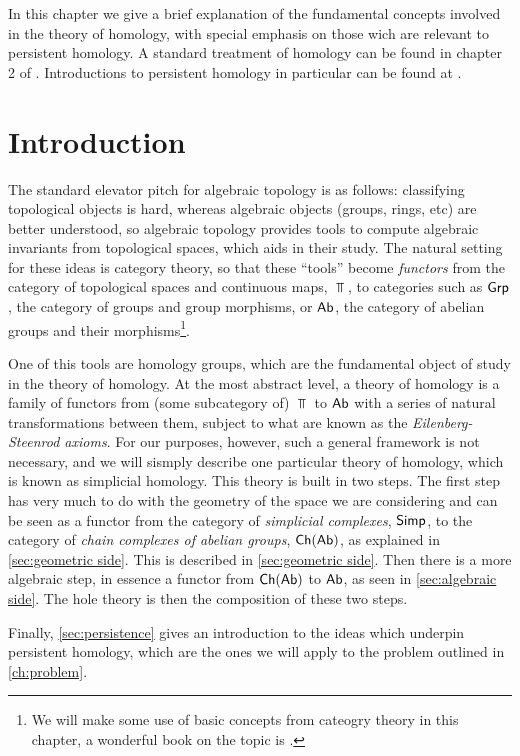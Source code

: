 \documentclass[../main.tex]{subfiles}
\begin{document}
In this chapter we give a brief explanation of the fundamental concepts involved in the
theory of homology, with special emphasis on those wich are relevant to persistent
homology. A standard treatment of homology can be found in chapter 2 of \cite{hatcher}.
Introductions to persistent homology in particular can be found at \cite{edelsbrunner08,
edelsbrunner12, edelsbrunner16}. 

\section{Introduction}
The standard elevator pitch for algebraic topology is as follows: classifying topological
objects is hard, whereas algebraic objects (groups, rings, etc) are better understood, so
algebraic topology provides tools to compute algebraic invariants from topological spaces,
which aids in their study. The natural setting for these ideas is category theory, so that
these ``tools'' become \emph{functors} from the category of topological spaces and
continuous maps, \( \Top \), to categories such as \( \mathsf{Grp} \), the category of groups and
group morphisms, or \( \mathsf{Ab} \), the category of abelian groups and their
morphisms\footnote{We will make some use of basic concepts from cateogry theory in this
chapter, a wonderful book on the topic is \cite{riehl}.}.

One of this tools are homology groups, which are the fundamental object of study in the
theory of homology. At the most abstract level, a theory of homology is a family of
functors from (some subcategory of) \( \Top \) to \( \mathsf{Ab} \) with a series of natural
transformations between them, subject to what are known as the \emph{Eilenberg-Steenrod
axioms}. For our purposes, however, such a general framework is not necessary, and we will
sismply describe one particular theory of homology, which is known as simplicial homology.
This theory is built in two steps. The first step has very much to do with the geometry of
the space we are considering and can be seen as a functor from the category of
\emph{simplicial complexes}, \( \mathsf{Simp} \), to the category of \emph{chain complexes of
abelian groups}, \( \mathsf{Ch}(\mathsf{Ab}) \), as explained in \cref{sec:geometric side}. This is
described in \cref{sec:geometric side}. Then there is a more algebraic step, in essence a
functor from \( \mathsf{Ch}(\mathsf{Ab}) \) to \( \mathsf{Ab} \), as seen in \cref{sec:algebraic side}. The hole
theory is then the composition of these two steps.

Finally, \cref{sec:persistence} gives an introduction to the ideas which underpin
persistent homology, which are the ones we will apply to the problem outlined in
\cref{ch:problem}. 
\end{document}
